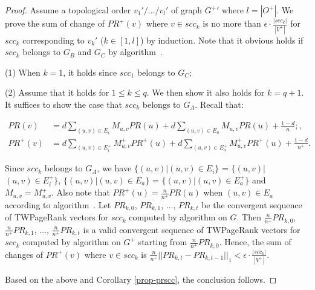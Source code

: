 \begin{proof}
Assume a topological order $v_1'/\dots/v_{l}'$ of graph $G^+{'}$ where $l=|O^+|$. We prove the sum of change of $PR^+(v)$ where $v\in scc_k$ is no more than $\epsilon\cdot\frac{|scc_k|}{|V^+|}$ for $scc_k$ corresponding to $v_k'$ ($k\in [1,l]$) by induction. Note that it obvious holds if $scc_k$ belongs to $G_B$ and $G_C$ by algorithm~\inctwprscc.

\noindent(1) When $k=1$, it holds since $scc_1$ belongs to $G_C$;

\noindent(2) Assume that it holds for $1\le k\le q$. We then show it also holds for $k=q+1$. It suffices to show the case that $scc_k$ belongs to $G_A$. Recall that: 
%
\begin{small}
\begin{equation*}
\begin{split}
PR(v) & =  d \sum_{(u,v)\in E_i} M_{u,v} PR(u) + d \sum_{(u,v)\in E_a} M_{u,v} PR(u) +  \frac{1-d}{n};,\\
PR^+(v) & =  d \sum_{(u,v)\in E^+_i} M^+_{u,v} PR^+(u) + d \sum_{(u,v)\in E^+_a} M^+_{u,v} PR^+(u) +  \frac{1-d}{n^+}.
\end{split}
\end{equation*}
\end{small}
\noindent
Since $scc_k$ belongs to $G_A$, we have $\{(u,v)|(u,v)\in E_i\}$ = $\{(u,v)|$ $(u,v)\in E^+_i\}$, $\{(u,v)|(u,v)\in E_a\}$ = $\{(u,v)|(u,v)\in E^+_a\}$ and $M_{u,v}=M^+_{u,v}$. Also note that $PR^+(u)=\frac{n}{n^+}PR(u)$ when $(u,v)\in E_a$ according to algorithm~\inctwprscc. Let $PR_{k,0}$, $PR_{k,1}$, $\dots$, $PR_{k,t}$ be the convergent sequence of TWPageRank vectors for $scc_k$ computed by algorithm \twprscc on $G$. Then $\frac{n}{n^+}PR_{k,0}$, $\frac{n}{n^+}PR_{k,1}$, $\dots$, $\frac{n}{n^+}PR_{k,t}$ is a valid convergent sequence of TWPageRank vectors for $scc_k$ computed by algorithm \inctwprscc on $G^+$ starting from $\frac{n}{n^+}PR_{k,0}$.
Hence, the sum of changes of $PR^+(v)$ where $v\in scc_k$ is $\frac{n}{n^+}||PR_{k,t}-PR_{k,t-1}||_1 < \epsilon\cdot\frac{|scc_k|}{|V^+|}$.

Based on the above and Corollary \ref{prop-prscc}, the conclusion follows.
\end{proof}


